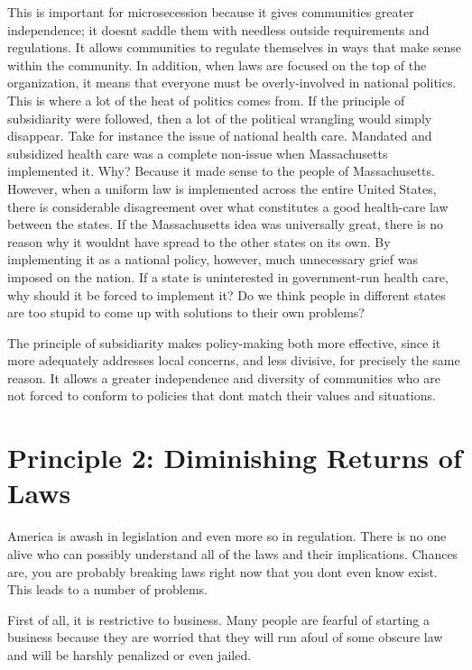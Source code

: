 This is important for microsecession because it gives communities
greater independence; it doesn{\textquotesingle}t saddle them with
needless outside requirements and regulations. It allows communities to
regulate themselves in ways that make sense within the community. In
addition, when laws are focused on the top of the organization, it
means that everyone must be overly-involved in national politics. This
is where a lot of the heat of politics comes from. If the principle of
subsidiarity were followed, then a lot of the political wrangling would
simply disappear. Take for instance the issue of national health care.
Mandated and subsidized health care was a complete non-issue when
Massachusetts implemented it. Why? Because it made sense to the people
of Massachusetts. However, when a uniform law is implemented across the
entire United States, there is considerable disagreement over what
constitutes a good health-care law between the states. If the
Massachusetts idea was universally great, there is no reason why it
wouldn{\textquotesingle}t have spread to the other states on its own.
By implementing it as a national policy, however, much unnecessary
grief was imposed on the nation. If a state is uninterested in
government-run health care, why should it be forced
to implement it?  Do
we think people in different states are too stupid to come up with
solutions to their own problems?

The principle of subsidiarity makes policy-making both more effective,
since it more adequately addresses local concerns, and less divisive,
for precisely the same reason. It allows a greater independence and
diversity of communities who are not forced to conform to policies that
don{\textquotesingle}t match their values and situations.

\section{Principle 2: Diminishing Returns of Laws}

America is awash in legislation and even more so in regulation. There is
no one alive who can possibly understand all of the laws and their
implications. Chances are, you are probably breaking laws right now
that you don{\textquotesingle}t even know exist. This leads to a number
of problems. 

First of all, it is restrictive to business. Many people are fearful of
starting a business because they are worried that they will run afoul
of some obscure law and will be harshly penalized or even jailed. 


